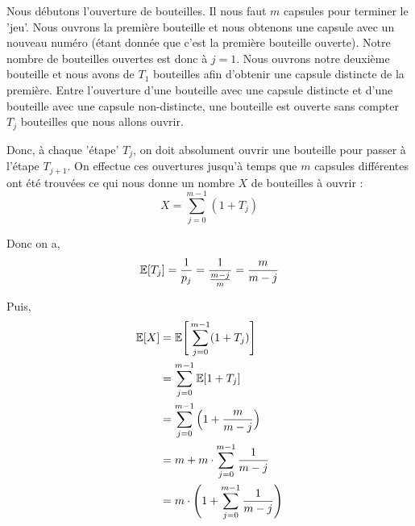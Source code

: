 \documentclass[10pt,a4paper]{article}
\begin{document}
	\vspace{.2cm}
	Nous débutons l'ouverture de bouteilles. Il nous faut $m$ capsules pour terminer le 'jeu'. Nous ouvrons la première bouteille et nous obtenons une capsule avec un nouveau numéro (étant donnée que c'est la première bouteille ouverte). Notre nombre de bouteilles ouvertes est donc à $j = 1$. 
	Nous ouvrons notre deuxième bouteille et nous avons de $T_1$ bouteilles afin d'obtenir une capsule distincte de la première. Entre l'ouverture d'une bouteille avec une capsule distincte et d'une bouteille avec une capsule non-distincte, une bouteille est ouverte sans compter $T_j$ bouteilles que nous allons ouvrir.

	\vspace{.3cm}
	Donc, à chaque 'étape' $T_j$, on doit absolument ouvrir une bouteille pour passer à l'étape $T_{j + 1}$. On effectue ces ouvertures jusqu'à temps que $m$ capsules différentes ont été trouvées ce qui nous donne un nombre $X$ de bouteilles à ouvrir :
	\[
	X = \sum^{m - 1}_{j = 0} (1 + T_j)
	\]

	Donc on a,
	\[
	\mathbb{E}[T_j] = \frac{1}{p_j} = \frac{1}{\frac{m - j}{m}} = \frac{m}{m - j} \notag
	\]

	Puis,
	\begin{align}
		\mathbb{E}[X] &= \mathbb{E}\Bigg[\sum^{m - 1}_{j = 0} (1 + T_j)\Bigg] \notag \\
		&= \sum^{m - 1}_{j = 0} \mathbb{E}[1 +T_j] \notag \\
		&= \sum^{m - 1}_{j = 0} \Big(1 + \frac{m}{m - j}\Big) \notag \\
		&= m + m \cdot \sum^{m - 1}_{j = 0} \frac{1}{m - j} \notag \\
		&= m \cdot \Bigg(1 + \sum^{m - 1}_{j = 0} \frac{1}{m - j}\Bigg) \notag
	\end{align}
\end{document}
